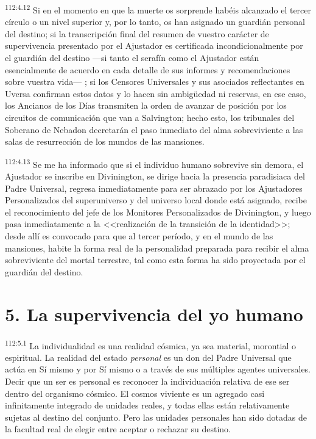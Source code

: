 \documentclass[twoside, 11pt]{book}
\begin{document}
\par
\textsuperscript{112:4.12} Si en el momento en que la muerte os sorprende habéis alcanzado el tercer círculo o un nivel superior y, por lo tanto, os han asignado un guardián personal del destino; si la transcripción final del resumen de vuestro carácter de supervivencia presentado por el Ajustador es certificada incondicionalmente por el guardián del destino ---si tanto el serafín como el Ajustador están esencialmente de acuerdo en cada detalle de sus informes y recomendaciones sobre vuestra vida--- ; si los Censores Universales y sus asociados reflectantes en Uversa confirman estos datos y lo hacen sin ambig\"uedad ni reservas, en ese caso, los Ancianos de los Días transmiten la orden de avanzar de posición por los circuitos de comunicación que van a Salvington; hecho esto, los tribunales del Soberano de Nebadon decretarán el paso inmediato del alma sobreviviente a las salas de resurrección de los mundos de las mansiones.

\par
\textsuperscript{112:4.13} Se me ha informado que si el individuo humano sobrevive sin demora, el Ajustador se inscribe en Divinington, se dirige hacia la presencia paradisiaca del Padre Universal, regresa inmediatamente para ser abrazado por los Ajustadores Personalizados del superuniverso y del universo local donde está asignado, recibe el reconocimiento del jefe de los Monitores Personalizados de Divinington, y luego pasa inmediatamente a la <<realización de la transición de la identidad>>; desde allí es convocado para que al tercer período, y en el mundo de las mansiones, habite la forma real de la personalidad preparada para recibir el alma sobreviviente del mortal terrestre, tal como esta forma ha sido proyectada por el guardián del destino.

\section*{5. La supervivencia del yo humano}
\par
\textsuperscript{112:5.1} La individualidad es una realidad cósmica, ya sea material, morontial o espiritual. La realidad del estado \textit{personal} es un don del Padre Universal que actúa en Sí mismo y por Sí mismo o a través de sus múltiples agentes universales. Decir que un ser es personal es reconocer la individuación relativa de ese ser dentro del organismo cósmico. El cosmos viviente es un agregado casi infinitamente integrado de unidades reales, y todas ellas están relativamente sujetas al destino del conjunto. Pero las unidades personales han sido dotadas de la facultad real de elegir entre aceptar o rechazar su destino.
\end{document}
